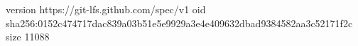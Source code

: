 version https://git-lfs.github.com/spec/v1
oid sha256:0152c474717dac839a03b51e5e9929a3e4e409632dbad9384582aa3c52171f2c
size 11088
